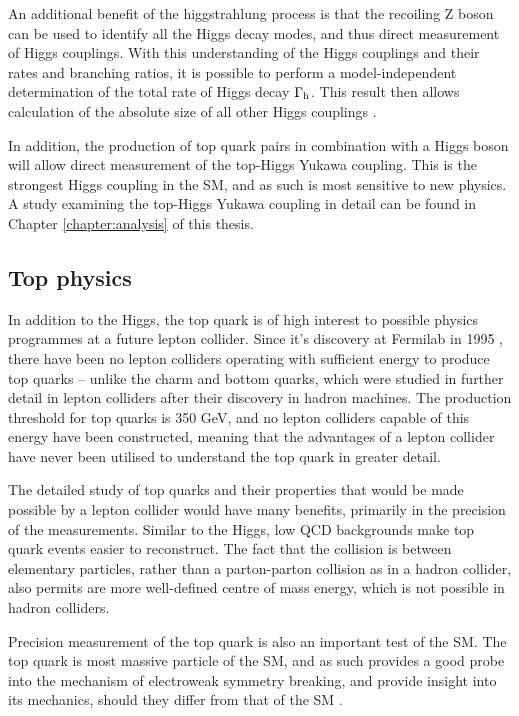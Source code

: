 An additional benefit of the higgstrahlung process is that the recoiling Z boson can be used to identify all the Higgs decay modes, and thus direct measurement of Higgs couplings. With this understanding of the Higgs couplings and their rates and branching ratios, it is possible to perform a model-independent determination of the total rate of Higgs decay $\Gamma\textsubscript{h}$. This result then allows calculation of the absolute size of all other Higgs couplings \cite{ilc-tdr-physics}.

In addition, the production of top quark pairs in combination with a Higgs boson will allow direct measurement of the top-Higgs Yukawa coupling. This is the strongest Higgs coupling in the \acrshort{SM}, and as such is most sensitive to new physics. A study examining the top-Higgs Yukawa coupling in detail can be found in Chapter \ref{chapter:analysis} of this thesis.

\subsection{Top physics}
In addition to the Higgs, the top quark is of high interest to possible physics programmes at a future lepton collider. Since it's discovery at Fermilab in 1995 \cite{top-quark}, there have been no lepton colliders operating with sufficient energy to produce top quarks -- unlike the charm and bottom quarks, which were studied in further detail in lepton colliders after their discovery in hadron machines. The production threshold for top quarks is 350 GeV, and no lepton colliders capable of this energy have been constructed, meaning that the advantages of a lepton collider have never been utilised to understand the top quark in greater detail. 

The detailed study of top quarks and their properties that would be made possible by a lepton collider would have many benefits, primarily in the precision of the measurements. Similar to the Higgs, low \acrshort{QCD} backgrounds make top quark events easier to reconstruct. The fact that the collision is between elementary particles, rather than a parton-parton collision as in a hadron collider, also permits are more well-defined centre of mass energy, which is not possible in hadron colliders.

Precision measurement of the top quark is also an important test of the \acrshort{SM}. The top quark is most massive particle of the \acrshort{SM}, and as such provides a good probe into the mechanism of electroweak symmetry breaking, and provide insight into its mechanics, should they differ from that of the \acrlong{SM} \cite{top-quark-lhc}. 

